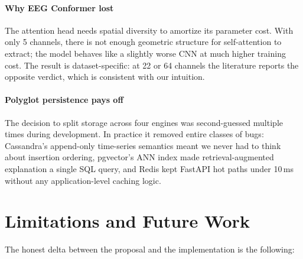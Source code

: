\documentclass[conference]{IEEEtran}
\begin{document}
\paragraph{Why EEG Conformer lost} The attention head needs spatial
diversity to amortize its parameter cost. With only 5 channels, there is
not enough geometric structure for self-attention to extract; the model
behaves like a slightly worse CNN at much higher training cost. The result
is dataset-specific: at 22 or 64 channels the literature reports the
opposite verdict, which is consistent with our intuition.

\paragraph{Polyglot persistence pays off} The decision to split storage
across four engines was second-guessed multiple times during development.
In practice it removed entire classes of bugs: Cassandra's append-only
time-series semantics meant we never had to think about insertion
ordering, pgvector's ANN index made retrieval-augmented explanation a
single SQL query, and Redis kept FastAPI hot paths under 10\,ms without
any application-level caching logic.

\section{Limitations and Future Work}
\label{sec:future}

The honest delta between the proposal and the implementation is the
following:
\end{document}
